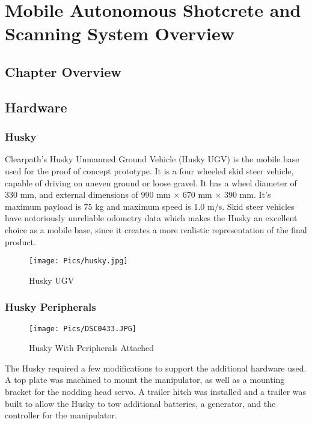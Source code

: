\chapter{Mobile Autonomous Shotcrete and Scanning System Overview}
\label{chap:overview}
\section{Chapter Overview}
\section{Hardware}
\subsection{Husky}
Clearpath's Husky Unmanned Ground Vehicle (Husky UGV) is the mobile base used for the proof of concept prototype. It is a four wheeled skid steer vehicle, capable of driving on uneven ground or loose gravel. It has a wheel diameter of 330 mm, and external dimensions of 990 mm $\times$ 670 mm $\times$ 390 mm. It's maximum payload is 75 kg and maximum speed is 1.0 m/s. Skid steer vehicles have notoriously unreliable odometry data which makes the Husky an excellent choice as a mobile base, since it creates a more realistic representation of the final product.\\
\begin{figure}[H]
    \centering
    \texttt{[image: Pics/husky.jpg]}
    \caption{Husky UGV \cite{huskypage}}
    \label{fig:husky}
\end{figure}
\subsection{Husky Peripherals}

\begin{figure}[H]
    \centering
    \texttt{[image: Pics/DSC0433.JPG]}
    \caption{Husky With Peripherals Attached}
    \label{fig:peripherals}
\end{figure}
The Husky required a few modifications to support the additional hardware used. A top plate was machined to mount the manipulator, as well as a mounting bracket for the nodding head servo. A trailer hitch was installed and a trailer was built to allow the Husky to tow additional batteries, a generator, and the controller for the manipulator.\\
